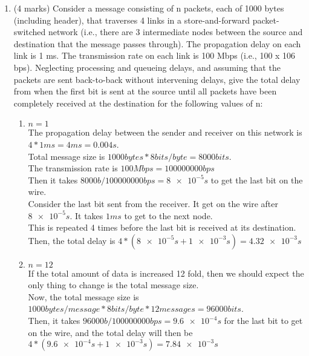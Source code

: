 \documentclass[10pt]{amsart}
\begin{document}
\begin{enumerate}
    \item (4 marks) Consider a message consisting of n packets, each of 1000
        bytes (including header), that traverses 4 links in a store-and-forward
        packet-switched network (i.e., there are 3 intermediate nodes between
        the source and destination that the message passes through). The
        propagation delay on each link is 1 ms. The transmission rate on each
        link is 100 Mbps (i.e., 100 x 106 bps). Neglecting processing and
        queueing delays, and assuming that the packets are sent back-to-back
        without intervening delays, give the total delay from when the first bit
        is sent at the source until all packets have been completely received at
        the destination for the following values of n:
    \begin{enumerate}
        \item $n = 1$\\
        The propagation delay between the sender and receiver on this network is $4 * 1ms = 4ms = 0.004s$.\\
        Total message size is $1000 bytes * 8bits/byte = 8000 bits$.\\
        The transmission rate is $100Mbps = 100000000bps$\\
        Then it takes $8000b / 100000000bps = \num{8e-5}s$ to get the last bit on the wire.\\
        Consider the last bit sent from the receiver.  It get on the wire after
            $\num{8e-5}s$.  It takes $1ms$ to get to the next node.\\
        This is repeated 4 times before the last bit is received at its
            destination.  Then, the total delay is $4 * (\num{8e-5}s +
            \num{1e-3}s) = \num{4.32e-3}s$
        \item $n = 12$\\
        If the total amount of data is increased 12 fold, then we should expect
            the only thing to change is the total message size.\\
        Now, the total message size is $1000bytes/message * 8 bits/byte * 12 messages = 96000bits$.\\
        Then, it takes $96000b / 100000000bps = \num{9.6e-4}s$ for the last bit
            to get on the wire, and the total delay will then be $4 *
            (\num{9.6e-4}s + \num{1e-3}s) = \num{7.84e-3}s$
    \end{enumerate}


\end{enumerate}
\end{document}
